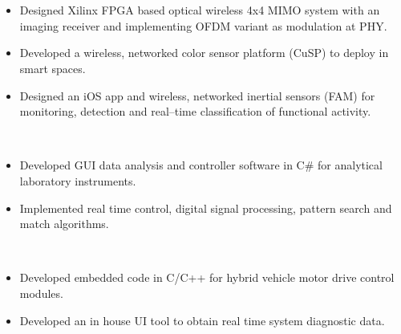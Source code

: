 \newline\newline
\vspace{0.05in}\\
\hfill {}\\
\begin{itemize}[noitemsep,topsep=0.25em,leftmargin=1.25em]
	\item Designed Xilinx FPGA based optical wireless 4x4 MIMO system with an imaging receiver and implementing OFDM variant as modulation at PHY.
	\item Developed a wireless, networked color sensor platform (CuSP) to deploy in smart spaces.
	\item Designed an iOS app and wireless, networked inertial sensors (FAM) for monitoring, detection and real--time classification of functional activity.
\end{itemize}
 \hfill {}\\
\begin{itemize}[noitemsep,topsep=0.25em,leftmargin=1.25em]
	\item Developed GUI data analysis and controller software in C\# for analytical laboratory instruments.
	\item Implemented real time control, digital signal processing, pattern search and match algorithms.
\end{itemize}
 \hfill {}\\
\begin{itemize}[noitemsep,topsep=0.25em,leftmargin=1.25em]
	\item Developed embedded code in C/C++ for hybrid vehicle motor drive control modules.
	\item Developed an in house UI tool to obtain real time system diagnostic data.
\end{itemize}
